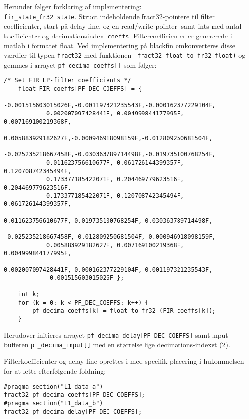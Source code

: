 Herunder følger forklaring af implementering: \\
\verb+fir_state_fr32 state+. Struct indeholdende fract32-pointere til filter coefficienter, start på delay line, og en read/write pointer, samt ints med antal koefficienter og decimationsindex. 
\verb+coeffs+. Filtercoefficienter er genererede i matlab i formatet float. Ved implementering på blackfin omkonverteres disse værdier til typen \verb+fract32+ med funktionen \verb+ fract32 float_to_fr32(float)+ og gemmes i arrayet \verb+pf_decima_coeffs[]+ som følger:
\begin{verbatim}
/* Set FIR LP-filter coefficients */
	float FIR_coeffs[PF_DEC_COEFFS] = {
			-0.001515603015026F,-0.001197321235543F,-0.000162377229104F,
			0.002007097428441F, 0.004999844177995F, 0.007169100219368F,
			0.005883929182627F,-0.000946918098159F,-0.012809250681504F,
			-0.025235218667458F,-0.030363789714498F,-0.019735100768254F,
			0.011623756610677F, 0.061726144399357F, 0.120708742345494F,
			0.173377185422071F, 0.204469779623516F, 0.204469779623516F,
			0.173377185422071F, 0.120708742345494F, 0.061726144399357F,
			0.011623756610677F,-0.019735100768254F,-0.030363789714498F,
			-0.025235218667458F,-0.012809250681504F,-0.000946918098159F,
			0.005883929182627F, 0.007169100219368F, 0.004999844177995F,
			0.002007097428441F,-0.000162377229104F,-0.001197321235543F,
			-0.001515603015026F	};

	int k;
	for (k = 0; k < PF_DEC_COEFFS; k++) {
		pf_decima_coeffs[k] = float_to_fr32 (FIR_coeffs[k]);
	}
\end{verbatim}
Herudover initieres arrayet \verb+pf_decima_delay[PF_DEC_COEFFS]+ samt input bufferen \verb+pf_decima_input[]+ med en størrelse lige decimations-indexet (2).

Filterkoefficienter og delay-line oprettes i med specifik placering i hukommelsen for at lette efterfølgende foldning:
\begin{verbatim}
#pragma section("L1_data_a")
fract32 pf_decima_coeffs[PF_DEC_COEFFS];
#pragma section("L1_data_b")
fract32 pf_decima_delay[PF_DEC_COEFFS];
\end{verbatim}

